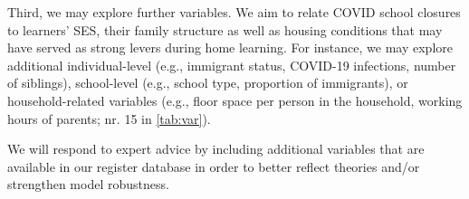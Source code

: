 Third, we may explore further variables. We aim to relate COVID school closures to learners' SES, their family structure as well as housing conditions that may have served as strong levers during home learning. For instance, we may explore additional individual-level (e.g., immigrant status, COVID-19 infections, number of siblings), school-level (e.g., school type, proportion of immigrants), or household-related variables (e.g., floor space per person in the household, working hours of parents; nr. 15 in \cref{tab:var}).

We will respond to expert advice by including additional variables that are available in our register database in order to better reflect theories and/or strengthen model robustness.
